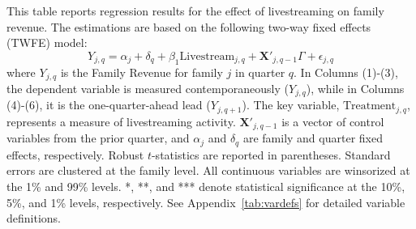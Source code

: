 \begin{table}[!ht]
    \centering
    
    \caption{Dynamic Livestream Effect on Family Revenue}\label{tab:family_twfe_flowrevenueimpact_reallocation}
    
    \begin{minipage}{0.95\textwidth}
        \footnotesize
        This table reports regression results for the effect of livestreaming on family revenue. The estimations are based on the following two-way fixed effects (TWFE) model:
        \begin{equation*}
            Y_{j,q} = \alpha_j + \delta_q + \beta_1 \text{Livestream}_{j,q} + \mathbf{X}'_{j,q-1} \Gamma + \epsilon_{j,q}
        \end{equation*}
        where $Y_{j,q}$ is the Family Revenue for family $j$ in quarter $q$. In Columns (1)-(3), the dependent variable is measured contemporaneously ($Y_{j,q}$), while in Columns (4)-(6), it is the one-quarter-ahead lead ($Y_{j,q+1}$). The key variable, $\text{Treatment}_{j,q}$, represents a measure of livestreaming activity. $\mathbf{X}'_{j,q-1}$ is a vector of control variables from the prior quarter, and $\alpha_j$ and $\delta_q$ are family and quarter fixed effects, respectively. Robust $t$-statistics are reported in parentheses. Standard errors are clustered at the family level. All continuous variables are winsorized at the 1\% and 99\% levels. *, **, and *** denote statistical significance at the 10\%, 5\%, and 1\% levels, respectively. See Appendix~\ref{tab:vardefs} for detailed variable definitions. %
    \end{minipage}

    \vspace{2mm}

     
    
\end{table}